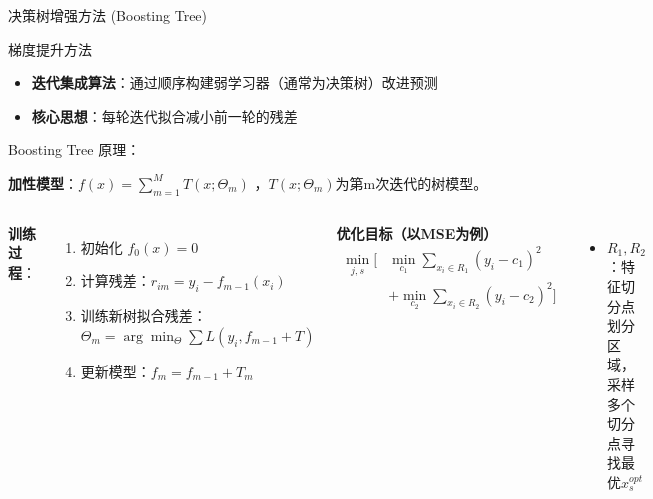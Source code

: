 \documentclass{ctexbeamer}
\begin{document}
\begin{frame}{决策树增强方法 (Boosting Tree)}

\begin{block}{梯度提升方法}
\begin{itemize}
\item \textbf{迭代集成算法}：通过顺序构建弱学习器（通常为决策树）改进预测
\item \textbf{核心思想}：每轮迭代拟合减小前一轮的残差
\end{itemize}
\end{block}

Boosting Tree 原理：

\textbf{加性模型}：$ f(x) = \sum_{m=1}^{M} T(x; \Theta_m) $
，$T(x; \Theta_m) $为第m次迭代的树模型。
\begin{columns}[T]
\textbf{训练过程}：
\begin{enumerate}
\small
\item 初始化 $f_0(x) = 0$
\item 计算残差：$r_{im} = y_i - f_{m-1}(x_i)$
\item 训练新树拟合残差：$\Theta_m = \arg\min_{\Theta} \sum L(y_i, f_{m-1} + T)$
\item 更新模型：$f_m = f_{m-1} + T_m$
\end{enumerate}

\textbf{优化目标（以MSE为例）}
\small
\[
\begin{aligned}
\min_{j, s} [ 
&\min_{c_1} \sum_{x_i \in R_1} (y_i - c_1)^2 \\
&+ \min_{c_2} \sum_{x_i \in R_2} (y_i - c_2)^2 
]
\end{aligned}
\]
\begin{itemize}
\item $R_1, R_2$：特征切分点划分区域，采样多个切分点寻找最优$x^{opt}_s$
\end{itemize}

\end{columns}


\end{frame}
\end{document}
